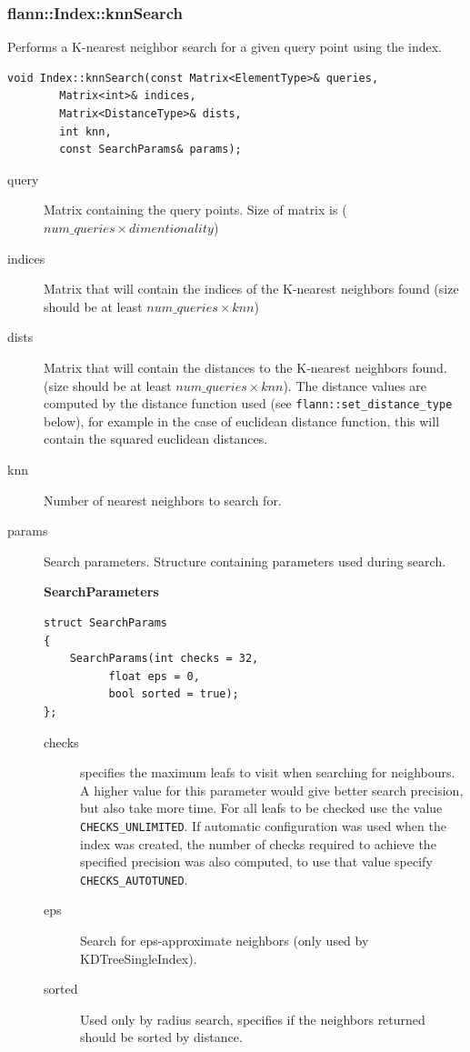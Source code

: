 \documentclass[letter,10pt]{article}
\begin{document}
\subsubsection{flann::Index::knnSearch}
Performs a K-nearest neighbor search for a given query point using the index.
\begin{Verbatim}[fontsize=\footnotesize,frame=single]
void Index::knnSearch(const Matrix<ElementType>& queries,
		Matrix<int>& indices, 
		Matrix<DistanceType>& dists,
		int knn,
		const SearchParams& params);
\end{Verbatim}
\begin{description}
\item[query]{Matrix containing the query points. Size of matrix is ($num\_queries \times dimentionality $)}
\item[indices]{Matrix that will contain the indices of the K-nearest neighbors found (size should be at least $num\_queries \times knn$)}
\item[dists]{Matrix that will contain the distances to the K-nearest neighbors found. (size should be at least $num\_queries \times knn$). The distance values are computed by the distance function used (see \texttt{flann::set\_distance\_type} below), for example in the case of euclidean distance function, this will contain the squared euclidean distances.}
\item[knn]{Number of nearest neighbors to search for.}
\item[params]{Search parameters.} Structure containing parameters used during search.

\textbf{SearchParameters}
\begin{Verbatim}[fontsize=\footnotesize]
struct SearchParams
{
	SearchParams(int checks = 32,
		  float eps = 0,
		  bool sorted = true);
};
\end{Verbatim}
\begin{description}
 \item[checks] specifies the maximum leafs to visit when searching for neighbours. A
higher value for this parameter would give better search precision, but
also take more time. For all leafs to be checked use the value \texttt{CHECKS\_UNLIMITED}.
If automatic configuration was used when the index was created, the number of checks 
required to achieve the specified precision was also computed, to use that value specify \texttt{CHECKS\_AUTOTUNED}.
 \item[eps] Search for eps-approximate neighbors (only used by KDTreeSingleIndex).
 \item[sorted] Used only by radius search, specifies if the neighbors returned should be sorted by distance.
\end{description}
\end{description}
\end{document}

